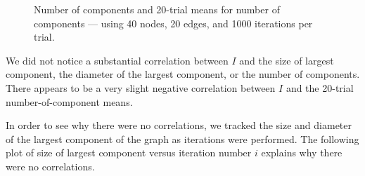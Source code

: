 \documentclass[a4paper,10pt]{article}
\begin{document}
\begin{figure}[H]
\begin{center}
\caption{Number of components and 20-trial means for number of components --- using 40 nodes, 20 edges, and 1000 iterations per trial.}
\end{center}
\end{figure} 

We did not notice a substantial correlation between $I$ and the size of largest component, the diameter of the largest component, or the number of components. There appears to be a very slight negative correlation between $I$ and the 20-trial number-of-component means.

In order to see why there were no correlations, we tracked the size and diameter of the largest component of the graph as iterations were performed. The following plot of size of largest component versus iteration number $i$ explains why there were no correlations. 
\end{document}
